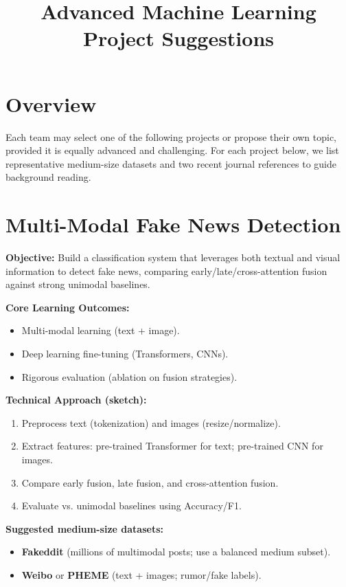 \documentclass[11pt]{article}
\title{Advanced Machine Learning\\Project Suggestions }
\date{}
\begin{document}
\maketitle

\section*{Overview}
Each team may select one of the following projects or propose their own topic, provided it is equally advanced and challenging. For each project below, we list representative medium-size datasets and two recent journal references to guide background reading.

\section{Multi-Modal Fake News Detection}
\textbf{Objective:} Build a classification system that leverages both textual and visual information to detect fake news, comparing early/late/cross-attention fusion against strong unimodal baselines.

\textbf{Core Learning Outcomes:}
\begin{itemize}[leftmargin=2em]
  \item Multi-modal learning (text + image).
  \item Deep learning fine-tuning (Transformers, CNNs).
  \item Rigorous evaluation (ablation on fusion strategies).
\end{itemize}

\textbf{Technical Approach (sketch):}
\begin{enumerate}[leftmargin=2em]
  \item Preprocess text (tokenization) and images (resize/normalize).
  \item Extract features: pre-trained Transformer for text; pre-trained CNN for images.
  \item Compare early fusion, late fusion, and cross-attention fusion.
  \item Evaluate vs. unimodal baselines using Accuracy/F1.
\end{enumerate}

\textbf{Suggested medium-size datasets:}
\begin{itemize}[leftmargin=2em]
  \item \textbf{Fakeddit} (millions of multimodal posts; use a balanced medium subset).
  \item \textbf{Weibo} or \textbf{PHEME} (text + images; rumor/fake labels).
\end{itemize}
\end{document}
